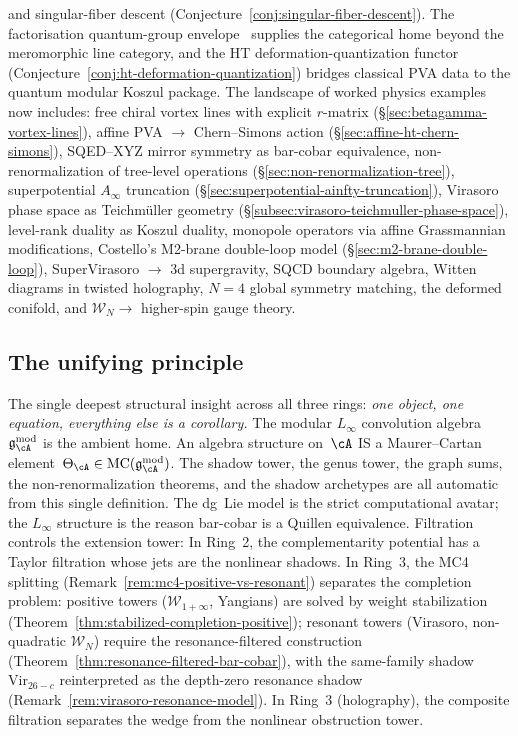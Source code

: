 \begin{enumerate}
  and singular-fiber descent
  (Conjecture~\ref{conj:singular-fiber-descent}).
  The factorisation quantum-group envelope~\cite{Latyntsev23}
  supplies the categorical home beyond the meromorphic line category,
  and the HT deformation-quantization functor
  (Conjecture~\ref{conj:ht-deformation-quantization})
  bridges classical PVA data to the quantum modular Koszul package.
  The landscape of worked physics examples now includes:
  free chiral vortex lines with explicit $r$-matrix
  (\S\ref{sec:betagamma-vortex-lines}),
  affine PVA $\to$ Chern--Simons action
  (\S\ref{sec:affine-ht-chern-simons}),
  SQED--XYZ mirror symmetry as bar-cobar equivalence,
  non-renormalization of tree-level operations
  (\S\ref{sec:non-renormalization-tree}),
  superpotential $A_\infty$ truncation
  (\S\ref{sec:superpotential-ainfty-truncation}),
  Virasoro phase space as Teichm\"uller geometry
  (\S\ref{subsec:virasoro-teichmuller-phase-space}),
  level-rank duality as Koszul duality,
  monopole operators via affine Grassmannian modifications,
  Costello's M2-brane double-loop model
  (\S\ref{sec:m2-brane-double-loop}),
  SuperVirasoro $\to$ 3d supergravity,
  SQCD boundary algebra,
  Witten diagrams in twisted holography,
  $N=4$ global symmetry matching,
  the deformed conifold,
  and $\mathcal{W}_N \to$ higher-spin gauge theory.
\end{enumerate}

\subsection*{The unifying principle}
The single deepest structural insight across all three rings:
\emph{one object, one equation, everything else is a corollary.}
The modular $L_\infty$ convolution algebra~$\mathfrak{g}_\cA^{\mathrm{mod}}$
is the ambient home.  An algebra structure on~$\cA$ IS a Maurer--Cartan
element~$\Theta_\cA \in \mathrm{MC}(\mathfrak{g}_\cA^{\mathrm{mod}})$.
The shadow tower, the genus tower, the graph sums, the non-renormalization
theorems, and the shadow archetypes are all automatic from this single
definition.  The dg~Lie model is the strict computational avatar;
the $L_\infty$ structure is the reason bar-cobar is a Quillen equivalence.
Filtration controls the extension tower:
In Ring~2, the complementarity potential has a Taylor filtration
whose jets are the nonlinear shadows.  In Ring~3, the MC4 splitting
(Remark~\ref{rem:mc4-positive-vs-resonant}) separates
the completion problem:
positive towers ($\mathcal{W}_{1+\infty}$, Yangians) are
solved by weight stabilization
(Theorem~\ref{thm:stabilized-completion-positive});
resonant towers (Virasoro, non-quadratic $\mathcal{W}_N$) require the
resonance-filtered construction
(Theorem~\ref{thm:resonance-filtered-bar-cobar}),
with the same-family shadow $\mathrm{Vir}_{26-c}$ reinterpreted as
the depth-zero resonance shadow
(Remark~\ref{rem:virasoro-resonance-model}).
In Ring~3 (holography),
the composite filtration separates the wedge from the nonlinear
obstruction tower.

